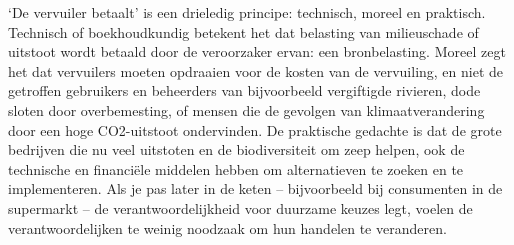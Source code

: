 
`De vervuiler betaalt' is een drieledig principe: technisch, moreel en praktisch. Technisch of boekhoudkundig betekent het dat belasting van milieuschade of uitstoot wordt betaald door de veroorzaker ervan: een bronbelasting. Moreel zegt het dat vervuilers moeten opdraaien voor de kosten van de vervuiling, en niet de getroffen gebruikers en beheerders van bijvoorbeeld vergiftigde rivieren, dode sloten door overbemesting, of mensen die de gevolgen van klimaatverandering door een hoge CO2-uitstoot ondervinden. De praktische gedachte is dat de grote bedrijven die nu veel uitstoten en de biodiversiteit om zeep helpen, ook de technische en financiële middelen hebben om alternatieven te zoeken en te implementeren. Als je pas later in de keten – bijvoorbeeld bij consumenten in de supermarkt – de verantwoordelijkheid voor duurzame keuzes legt, voelen de verantwoordelijken te weinig noodzaak om hun handelen te veranderen.
